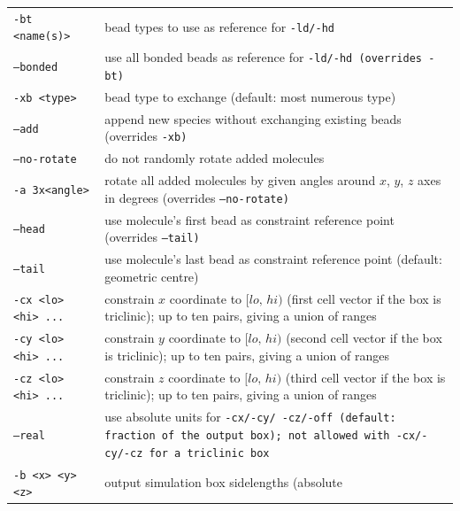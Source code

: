 \begin{longtable}{p{}p{}}
  \tt{-bt <name(s)>}          & bead types to use as reference for
                                \tt{-ld}/\tt{-hd}\\
  \tt{--bonded}               & use all bonded beads as reference for
                                \tt{-ld}/\tt{-hd} (overrides \tt{-bt})\\
  \tt{-xb <type>}             & bead type to exchange (default: most numerous
                                type)\\
  \tt{--add}                  & append new species without exchanging existing
                                beads (overrides \tt{-xb})\\
  \tt{--no-rotate}            & do not randomly rotate added molecules\\
  \tt{-a 3x<angle>}           & rotate all added molecules by given angles
                                around $x$, $y$, $z$ axes in degrees (overrides
                                \tt{--no-rotate})\\
  \tt{--head}                 & use molecule's first bead as constraint
                                reference point (overrides \tt{--tail})\\
  \tt{--tail}                 & use molecule's last bead as constraint
                                reference point (default: geometric centre)\\
  \tt{-cx <lo> <hi> ...}      & constrain $x$ coordinate to $[lo,\,hi)$ (first
                                cell vector if the box is triclinic); up to ten
                                pairs, giving a union of ranges\\
  \tt{-cy <lo> <hi> ...}      & constrain $y$ coordinate to $[lo,\,hi)$ (second
                                cell vector if the box is triclinic); up to ten
                                pairs, giving a union of ranges\\
  \tt{-cz <lo> <hi> ...}      & constrain $z$ coordinate to $[lo,\,hi)$ (third
                                cell vector if the box is triclinic); up to ten
                                pairs, giving a union of ranges\\
  \tt{--real}                 & use absolute units for \tt{-cx}/\tt{-cy}/
                                \tt{-cz}/\tt{-off} (default: fraction of the
                                output box); not allowed with
                                \tt{-cx}/\tt{-cy}/\tt{-cz} for a triclinic
                                box\\
  \tt{-b <x> <y> <z>}         & output simulation box sidelengths (absolute

\end{longtable}
